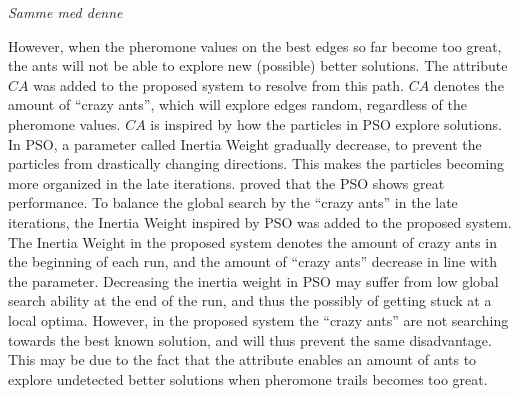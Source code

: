 \emph{\color{blue}Samme med denne}

However, when the pheromone values on the best edges so far become too great, the ants will not be able to explore new (possible) better solutions. The attribute $CA$ was added to the proposed system to resolve from this path. $CA$ denotes the amount of ``crazy ants'', which will explore edges random, regardless of the pheromone values. $CA$ is inspired by how the particles in PSO explore solutions. In PSO, a parameter called Inertia Weight gradually decrease, to prevent the particles from drastically changing directions. This makes the particles becoming more organized in the late iterations. \citet{kechagiopoulos14} proved that the PSO shows great performance. To balance the global search by the ``crazy ants'' in the late iterations, the Inertia Weight inspired by PSO was added to the proposed system. The Inertia Weight in the proposed system denotes the amount of crazy ants in the beginning of each run, and the amount of ``crazy ants'' decrease in line with the parameter. Decreasing the inertia weight in PSO may suffer from low global search ability at the end of the run, and thus the possibly of getting stuck at a local optima. However, in the proposed system the ``crazy ants'' are not searching towards the best known solution, and will thus prevent the same disadvantage. This may be due to the fact that the attribute enables an amount of ants to explore undetected better solutions when pheromone trails becomes too great.
\newline 


